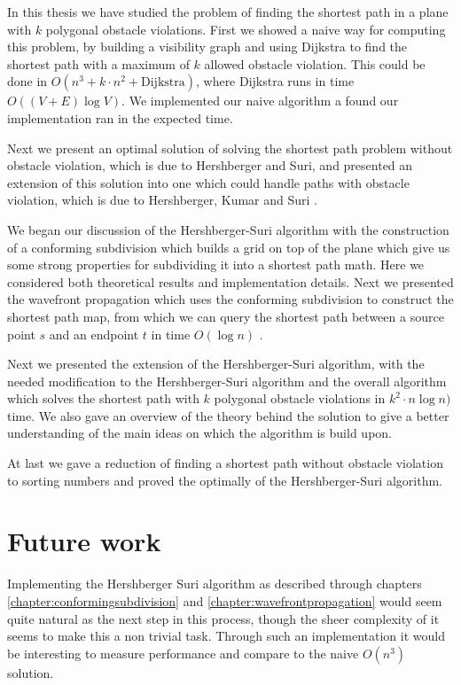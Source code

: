 In this thesis we have studied the problem of finding the shortest path in a plane with $k$ 
polygonal obstacle violations. First we showed a naive way for computing this problem, by 
building a visibility graph and using Dijkstra to find the shortest path with a maximum of 
$k$ allowed obstacle violation. This could be done in $O(n^3 + k \cdot n^2 + \text{Dijkstra})$, 
where Dijkstra runs in time $O((V + E) \log V)$. We implemented our naive algorithm a found 
our implementation ran in the expected time. 

Next we present an optimal solution of solving the shortest path problem without obstacle violation, 
which is due to Hershberger and Suri\cite{HershbergerS99}, and presented an extension of this solution 
into one which could handle paths with obstacle violation, which is due to Hershberger, Kumar and Suri
\cite{HershbergerKS17}. 

We began our discussion of the Hershberger-Suri algorithm with the construction of a conforming 
subdivision which builds a grid on top of the plane which give us some strong properties for subdividing 
it into a shortest path math. Here we considered both theoretical results and implementation details. 
Next we presented the wavefront propagation which uses the conforming subdivision to construct 
the shortest path map, from which we can query the shortest path between a source point $s$ 
and an endpoint $t$ in time $O(\log n)$ \cite{DBLP:journals/siamcomp/Kirkpatrick83}. 

Next we presented the extension of the Hershberger-Suri algorithm, with the needed modification
to the Hershberger-Suri algorithm and the overall algorithm which solves the shortest path with
$k$ polygonal obstacle violations in $k^2 \cdot n \log n)$ time. We also gave an overview of the
theory behind the solution to give a better understanding of the main ideas on which the algorithm
is build upon.

At last we gave a reduction of finding a shortest path without obstacle violation to sorting numbers
and proved the optimally of the Hershberger-Suri algorithm.

\section{Future work}

Implementing the Hershberger Suri algorithm as described through chapters \ref{chapter:conformingsubdivision} and 
\ref{chapter:wavefrontpropagation} would seem quite natural as the next step in this process, though the sheer complexity
of it seems to make this a non trivial task. Through such an implementation it would be interesting to measure performance
and compare to the naive $O(n^3)$ solution.

